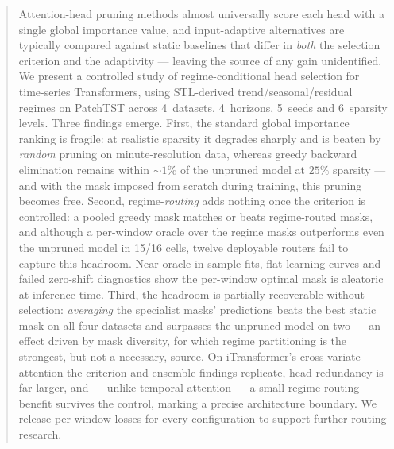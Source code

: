 
\begin{abstract}
Attention-head pruning methods almost universally score each head with a
single global importance value, and input-adaptive alternatives are
typically compared against static baselines that differ in \emph{both} the
selection criterion and the adaptivity --- leaving the source of any gain
unidentified. We present a controlled study of regime-conditional head
selection for time-series Transformers, using STL-derived
trend/seasonal/residual regimes on PatchTST across 4~datasets,
4~horizons, 5~seeds and 6~sparsity levels. Three findings emerge. First,
the standard global importance ranking is fragile: at realistic sparsity
it degrades sharply and is beaten by \emph{random} pruning on
minute-resolution data, whereas greedy backward elimination remains within
${\sim}1\%$ of the unpruned model at $25\%$ sparsity --- and with the mask
imposed from scratch during training, this pruning becomes free. Second,
regime-\emph{routing} adds nothing once the criterion is controlled: a
pooled greedy mask matches or beats regime-routed masks, and although a
per-window oracle over the regime masks outperforms even the unpruned
model in 15/16 cells, twelve deployable routers fail to capture this
headroom. Near-oracle in-sample fits, flat learning curves and failed
zero-shift diagnostics show the per-window optimal mask is aleatoric at
inference time. Third, the headroom is partially recoverable without
selection: \emph{averaging} the specialist masks' predictions beats the
best static mask on all four datasets and surpasses the unpruned model on
two --- an effect driven by mask diversity, for which regime partitioning
is the strongest, but not a necessary, source. On iTransformer's
cross-variate attention the criterion and ensemble findings replicate,
head redundancy is far larger, and --- unlike temporal attention --- a
small regime-routing benefit survives the control, marking a precise
architecture boundary. We release per-window losses for every
configuration to support further routing research.
\end{abstract}
